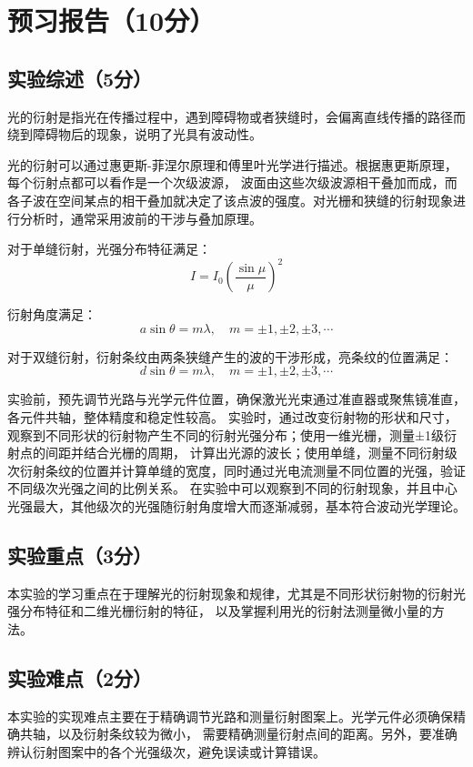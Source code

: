 \documentclass{Phyport}
\begin{document}
\setcounter{page}{0}
\makecover

\section{预习报告（10分）}
\subsection{实验综述（5分）}

光的衍射是指光在传播过程中，遇到障碍物或者狭缝时，会偏离直线传播的路径而绕到障碍物后的现象，说明了光具有波动性。

光的衍射可以通过惠更斯-菲涅尔原理和傅里叶光学进行描述。根据惠更斯原理，每个衍射点都可以看作是一个次级波源，
波面由这些次级波源相干叠加而成，而各子波在空间某点的相干叠加就决定了该点波的强度。对光栅和狭缝的衍射现象进行分析时，通常采用波前的干涉与叠加原理。

对于单缝衍射，光强分布特征满足：
\[
    I = I_0 (\frac{\sin \mu}{\mu})^2
\]

衍射角度满足：
\[
    a \sin \theta = m \lambda , \quad m = \pm 1, \pm 2, \pm 3, \cdots
\]

对于双缝衍射，衍射条纹由两条狭缝产生的波的干涉形成，亮条纹的位置满足：
\[
    d \sin \theta = m \lambda , \quad m = \pm 1, \pm 2, \pm 3, \cdots
\]  

实验前，预先调节光路与光学元件位置，确保激光光束通过准直器或聚焦镜准直，各元件共轴，整体精度和稳定性较高。
实验时，通过改变衍射物的形状和尺寸，观察到不同形状的衍射物产生不同的衍射光强分布；使用一维光栅，测量±1级衍射点的间距并结合光栅的周期，
计算出光源的波长；使用单缝，测量不同衍射级次衍射条纹的位置并计算单缝的宽度，同时通过光电流测量不同位置的光强，验证不同级次光强之间的比例关系。
在实验中可以观察到不同的衍射现象，并且中心光强最大，其他级次的光强随衍射角度增大而逐渐减弱，基本符合波动光学理论。


\subsection{实验重点（3分）}

本实验的学习重点在于理解光的衍射现象和规律，尤其是不同形状衍射物的衍射光强分布特征和二维光栅衍射的特征，
以及掌握利用光的衍射法测量微小量的方法。


\subsection{实验难点（2分）}

本实验的实现难点主要在于精确调节光路和测量衍射图案上。光学元件必须确保精确共轴，以及衍射条纹较为微小，
需要精确测量衍射点间的距离。另外，要准确辨认衍射图案中的各个光强级次，避免误读或计算错误。
\end{document}
